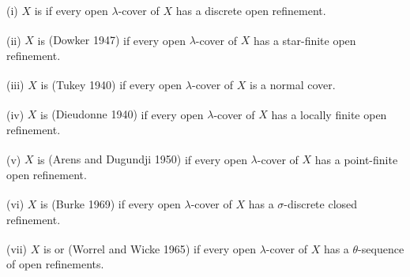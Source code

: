 \documentclass[main.tex]{subfiles}
\begin{document}
{ \label{def:1.1.8}
	\textup{(i)}  $X$ is 
	if every open $\lambda$-cover of $X$ has a discrete open refinement.
	
	\textup{(ii)} $X$ is 
	\textup{(\hstretch{1.8}{[}Dowker 1947\hstretch{1.8}{]}\textsuperscript{\cite{Dowker}})}
	if every open $\lambda$-cover of $X$ has a star-finite open refinement.
	
	\textup{(iii)} $X$ is 
	\textup{(\hstretch{1.8}{[}Tukey 1940\hstretch{1.8}{]}\textsuperscript{\cite{Tukey}})}
	if every open $\lambda$-cover of $X$ is a normal cover.
	
	\textup{(iv)} $X$ is 
	\textup{(\hstretch{1.8}{[}Dieudonne 1940\hstretch{1.8}{]}\textsuperscript{\cite{Dieudonne}})}
	if every open $\lambda$-cover of $X$ has a locally finite open refinement.
	
	\textup{(v)} $X$ is 
	\textup{(\hstretch{1.8}{[}Arens and Dugundji 1950\hstretch{1.8}{]}\textsuperscript{\cite{ArensDugundji}})}
	if every open $\lambda$-cover of $X$ has a point-finite open refinement.
	
	\textup{(vi)} $X$ is 
	\textup{(\hstretch{1.8}{[}Burke 1969\hstretch{1.8}{]}\textsuperscript{\cite{Burke}})}
	if every open $\lambda$-cover of $X$ has a 
	$\sigma$-discrete closed refinement.
	
	\textup{(vii)} $X$ is 
	or 
	\textup{(\hstretch{1.8}{[}Worrel and Wicke 1965\hstretch{1.8}{]}\textsuperscript{\cite{WorrellWicke}})}
	if every open $\lambda$-cover of $X$ has a $\theta$-sequence
	of open refinements.
} %
\end{document}
